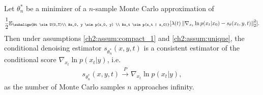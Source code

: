 \begin{customcoll}{1}
    Let $\theta_n^\ast$ be a minimizer of a $n$-sample Monte Carlo approximation of \begin{gather*}
        \begin{aligned}
                \frac{1}{2} \mathbb{E}_{\subalign{&t \sim U(0,T)\\ &x_0, y \sim p(x_0, y) \\ &x_t \sim p(x_t | x_0)}} 
                [\lambda(t) \norm{\nabla_{x_t} \ln{p(x_t | x_0)} - s_\theta(x_t, y, t)}_2^2].
        \end{aligned}
        \end{gather*} 
        Then under assumptions \ref{ch2:assum:compact_1} and \ref{ch2:assum:unique}, the conditional denoising estimator $s_{\theta_n^\ast}(x,y,t)$ is a consistent estimator of the conditional score $\nabla_{x_t} \ln p(x_t | y)$, i.e.
    \begin{gather*}
        s_{\theta_n^\ast}(x,y,t) \overset{P}{\to} \nabla_{x_t} \ln p(x_t | y),
    \end{gather*}
    as the number of Monte Carlo samples $n$ approaches infinity.
\end{customcoll}

